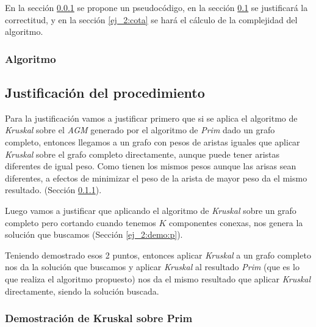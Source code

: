 En la secci\'on \ref{ej_2:algoritmo} se propone un pseudoc\'odigo, %
en la secci\'on \ref{ej_2:justificacion} se justificar\'a la correctitud, y en la secci\'on \ref{ej_2:cota} se har\'a el c\'alculo de la complejidad del algoritmo.

\subsubsection{Algoritmo} \label{ej_2:algoritmo}




\subsection{Justificaci\'on del procedimiento} \label{ej_2:justificacion}

Para la justificaci\'on vamos a justificar primero que si se aplica el algoritmo de \emph{Kruskal} sobre el \emph{AGM} generado por el algoritmo de \emph{Prim} dado un grafo completo, entonces llegamos a un grafo con pesos de aristas iguales que aplicar \emph{Kruskal} sobre el grafo completo directamente, aunque puede tener aristas diferentes de igual peso. Como tienen los mismos pesos aunque las arisas sean diferentes, a efectos de minimizar el peso de la arista de mayor peso da el mismo resultado. (Secci\'on \ref{ej_2:demo:k}).

Luego vamos a justificar que aplicando el algoritmo de \emph{Kruskal} sobre un grafo completo pero cortando cuando tenemos $K$ componentes conexas, nos genera la soluci\'on que buscamos (Secci\'on \ref{ej_2:demo:p}).

Teniendo demostrado esos 2 puntos, entonces aplicar \emph{Kruskal} a un grafo completo nos da la soluci\'on que buscamos y aplicar \emph{Kruskal} al resultado \emph{Prim} (que es lo que realiza el algoritmo propuesto) nos da el mismo resultado que aplicar \emph{Kruskal} directamente, siendo la soluci\'on buscada.

\subsubsection{Demostraci\'on de Kruskal sobre Prim} \label{ej_2:demo:k}

